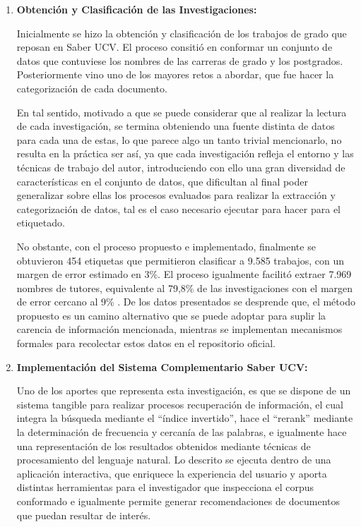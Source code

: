 \documentclass[
  12pt,
  openany]{book}
\begin{document}
\begin{enumerate}
\def\labelenumi{\arabic{enumi}.}
\item
  \textbf{Obtención y Clasificación de las Investigaciones:}

  Inicialmente se hizo la obtención y clasificación de los trabajos de grado que reposan en Saber UCV. El proceso consitió en conformar un conjunto de datos que contuviese los nombres de las carreras de grado y los postgrados. Posteriormente vino uno de los mayores retos a abordar, que fue hacer la categorización de cada documento.

  En tal sentido, motivado a que se puede considerar que al realizar la lectura de cada investigación, se termina obteniendo una fuente distinta de datos para cada una de estas, lo que parece algo un tanto trivial mencionarlo, no resulta en la práctica ser así, ya que cada investigación refleja el entorno y las técnicas de trabajo del autor, introduciendo con ello una gran diversidad de características en el conjunto de datos, que dificultan al final poder generalizar sobre ellas los procesos evaluados para realizar la extracción y categorización de datos, tal es el caso necesario ejecutar para hacer para el etiquetado.

  No obstante, con el proceso propuesto e implementado, finalmente se obtuvieron 454 etiquetas que permitieron clasificar a 9.585 trabajos, con un margen de error estimado en 3\%. El proceso igualmente facilitó extraer 7.969 nombres de tutores, equivalente al 79,8\% de las investigaciones con el margen de error cercano al 9\% . De los datos presentados se desprende que, el método propuesto es un camino alternativo que se puede adoptar para suplir la carencia de información mencionada, mientras se implementan mecanismos formales para recolectar estos datos en el repositorio oficial.
\item
  \textbf{Implementación del Sistema Complementario Saber UCV:}

  Uno de los aportes que representa esta investigación, es que se dispone de un sistema tangible para realizar procesos recuperación de información, el cual integra la búsqueda mediante el ``índice invertido'', hace el ``rerank'' mediante la determinación de frecuencia y cercanía de las palabras, e igualmente hace una representación de los resultados obtenidos mediante técnicas de procesamiento del lenguaje natural. Lo descrito se ejecuta dentro de una aplicación interactiva, que enriquece la experiencia del usuario y aporta distintas herramientas para el investigador que inspecciona el corpus conformado e igualmente permite generar recomendaciones de documentos que puedan resultar de interés.


\end{enumerate}
\end{document}
